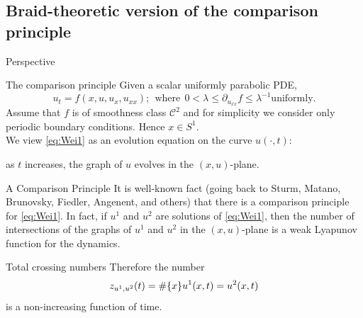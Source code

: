 \documentclass[9pt, english]{beamer}
\theoremstyle{definition}
\begin{document}
\subsection{Braid-theoretic version of the comparison principle}
\begin{frame}{Perspective}
    \begin{block}{The comparison principle}
        Given a scalar uniformly parabolic PDE,
        \begin{equation}\label{eq:Wei1}
        u_t=f(x, u, u_x, u_{xx}); \ \ \textrm{where}\ \ 0<\lambda \leq
        \partial_{u_{xx}}f \leq \lambda^{-1} \textrm{uniformly}.
        \end{equation}\pause
        Assume that $f$ is of smoothness class $\mathscr C^2$ and
        for simplicity we consider only periodic boundary
        conditions. Hence $x \in S^1$.\pause \\
        We view \eqref{eq:Wei1} as an evolution equation on the
        curve $u(\cdot, t):$\pause

        \alert{as $t$ increases, the graph of $u$ evolves in the
        $(x,u)$-plane.}
    \end{block}
\end{frame}
\begin{frame}
    \begin{block}{A Comparison Principle}
        It is well-known fact (going back to Sturm, Matano, Brunovsky,
        Fiedler, Angenent, and others) that there is a \alert{comparison
        principle} for \eqref{eq:Wei1}. \pause
        In fact, if $u^1$ and $u^2$ are  solutions of \eqref{eq:Wei1},
        then the number of intersections of the graphs of $u^1$ and
        $u^2$ in the $(x,u)$-plane is a \alert{weak Lyapunov function
        for the dynamics}.
    \end{block}\pause
    \begin{block}{Total crossing numbers}
        Therefore the number
        {\color{blue}
        \[
        z_{u^1, u^2}(t)=\#{\{{x}\}}{u^1(x,t)=u^2(x,t)}
        \]\/}\pause
        is a non-increasing function of time.
    \end{block}

\end{frame}
\end{document}
